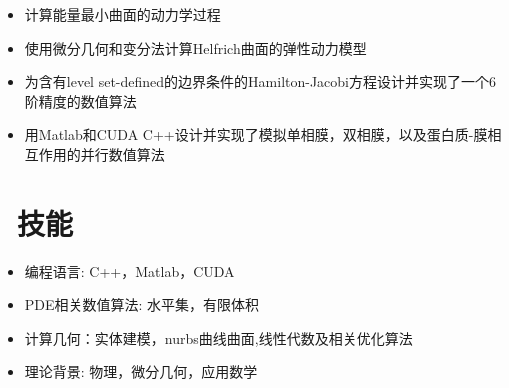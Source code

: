 \documentclass{resume}
\begin{document}

\begin{onehalfspacing}

\begin{itemize}
  \item 计算能量最小曲面的动力学过程
  \item 使用微分几何和变分法计算Helfrich曲面的弹性动力模型
  \item 为含有level set-defined的边界条件的Hamilton-Jacobi方程设计并实现了一个6阶精度的数值算法
  \item 用Matlab和CUDA C++设计并实现了模拟单相膜，双相膜，以及蛋白质-膜相互作用的并行数值算法
\end{itemize}
\end{onehalfspacing}







\section{\faCogs\ 技能}
\begin{itemize}[parsep=0.5ex]
  \item 编程语言: C++，Matlab，CUDA
  \item PDE相关数值算法: 水平集，有限体积
  \item 计算几何：实体建模，nurbs曲线曲面,线性代数及相关优化算法
  \item 理论背景: 物理，微分几何，应用数学
\end{itemize}
\end{document}
